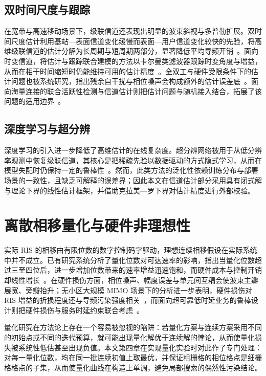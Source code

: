 \subsection{双时间尺度与跟踪}
在宽带与高速移动场景下，级联信道还表现出明显的波束斜视与多普勒扩展。双时间尺度估计利用基站—表面信道变化缓慢而表面—用户信道变化较快的先验，将高维级联信道的估计分解为长周期与短周期两部分，显著降低平均导频开销~\cite{hu2021ris}。面向时变信道，将估计与跟踪联合建模的方法以卡尔曼类滤波器跟踪时变角度与增益，从而在相干时间缩短时仍能维持可用的估计精度~\cite{zhang2025ris}。全双工与硬件受限条件下的估计问题也被系统研究，指出残余自干扰与相位噪声会构成额外的估计误差底~\cite{fernandes2023ris}。面向海量连接的联合活跃性检测与信道估计则把估计问题与随机接入结合，拓展了该问题的适用边界~\cite{xia2021ris}。

\subsection{深度学习与超分辨}
深度学习的引入进一步降低了高维估计的在线复杂度。超分辨网络被用于从低分辨率观测中恢复级联信道，其核心是把稀疏先验以数据驱动的方式隐式学习，从而在模型失配时仍保持一定的鲁棒性~\cite{shen2023ris}。然而，此类方法的泛化性依赖训练分布与部署场景的一致性，且缺乏可解释的误差界；因此本文在信道估计部分采用具有闭式解与理论下界的线性估计框架，并借助克拉美—罗下界对估计精度进行外部校验。

\section{离散相移量化与硬件非理想性}

实际 RIS 的相移由有限位数的数字控制码字驱动，理想连续相移假设在实际系统中并不成立。已有研究系统分析了量化位数对可达速率的影响，指出当量化位数超过三至四位后，进一步增加位数带来的速率增益迅速饱和，而硬件成本与控制开销却线性增长~\cite{boulogeorgos2020ris}。在硬件损伤方面，相位噪声、幅度误差与单元间互耦会使波束主瓣展宽、旁瓣抬升；无小区大规模 MIMO 场景下的分析进一步表明，硬件损伤对 RIS 增益的折损程度还与导频污染强度相关~\cite{zhang2023ris}，而面向超可靠低时延业务的鲁棒设计则把硬件损伤与服务时延约束联合考虑~\cite{chen2025ris}。

量化研究在方法论上存在一个容易被忽视的陷阱：若量化方案与连续方案采用不同的初始点或不同的迭代预算，就可能出现量化解优于连续解的悖论，从而使量化损失被系统性低估甚至出现负值。本文第四章在实现量化实验时对此作了专门处理：对每一量化位数，均在同一批连续初值上取最优，并保证粗栅格的相位格点是细栅格格点的子集，从而使量化曲线在构造上单调，避免局部搜索的偶然性污染结论。

